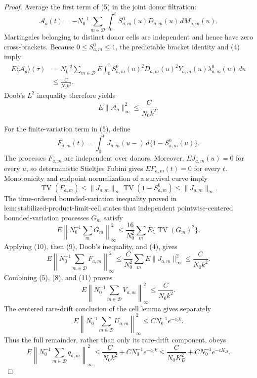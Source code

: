 \documentclass{article}
\begin{document}
\begin{proof}
Average the first term of (5) in the joint donor filtration:
\[
 \mathcal A_a(t)=-N_0^{-1}\sum_{m\in\mathcal D}
 \int_0^tS^0_{a,m}(u)D_{a,m}(u)\,dM_{a,m}(u).          \tag{6}
\]
Martingales belonging to distinct donor cells are independent and hence have
zero cross-brackets.  Because \(0\leq S^0_{a,m}\leq1\), the predictable
bracket identity and (4) imply
\[
 \begin{split}
 E\langle\mathcal A_a\rangle(\bar\tau)
 &=N_0^{-2}\sum_{m\in\mathcal D}E\int_0^{\bar\tau}
   S^0_{a,m}(u)^2D_{a,m}(u)^2Y_{a,m}(u)
   \lambda^0_{a,m}(u)\,du\\
 &\leq \frac{C}{N_0k^2}.
 \end{split}                                           \tag{7}
\]
Doob's \(L^2\) inequality therefore yields
\[
 E\|\mathcal A_a\|_\infty^2\leq\frac{C}{N_0k^2}.     \tag{8}
\]

For the finite-variation term in (5), define
\[
 F_{a,m}(t)=\int_0^tJ_{a,m}(u-)\,d\{1-S^0_{a,m}(u)\}.
\]
The processes \(F_{a,m}\) are independent over donors.  Moreover,
\(EJ_{a,m}(u)=0\) for every \(u\), so deterministic Stieltjes Fubini gives
\(EF_{a,m}(t)=0\) for every \(t\).  Monotonicity and endpoint normalization
of a survival curve imply
\[
 \operatorname{TV}(F_{a,m})
 \leq\|J_{a,m}\|_\infty
      \operatorname{TV}(1-S^0_{a,m})
 \leq\|J_{a,m}\|_\infty.                              \tag{9}
\]
The time-ordered bounded-variation inequality proved in
\(\mathrm{lem:stabilized\mbox{-}product\mbox{-}limit\mbox{-}cell}\)
states that independent pointwise-centered bounded-variation processes
\(G_m\) satisfy
\[
 E\left\|N_0^{-1}\sum_mG_m\right\|_\infty^2
 \leq\frac{16}{N_0^2}\sum_mE\{\operatorname{TV}(G_m)^2\}. \tag{10}
\]
Applying (10), then (9), Doob's inequality, and (4), gives
\[
 E\left\|N_0^{-1}\sum_{m\in\mathcal D}F_{a,m}\right\|_\infty^2
 \leq\frac{C}{N_0^2}\sum_mE\|J_{a,m}\|_\infty^2
 \leq\frac{C}{N_0k^2}.                                \tag{11}
\]
Combining (5), (8), and (11) proves
\[
 E\left\|N_0^{-1}\sum_{m\in\mathcal D}V_{a,m}\right\|_\infty^2
 \leq\frac{C}{N_0k^2}.                                \tag{12}
\]
The centered rare-drift conclusion of the cell lemma gives separately
\[
 E\left\|N_0^{-1}\sum_{m\in\mathcal D}U_{a,m}\right\|_\infty^2
 \leq C N_0^{-1}e^{-c_0k}.                             \tag{13}
\]
Thus the full remainder, rather than only its rare-drift component, obeys
\[
 E\left\|N_0^{-1}\sum_{m\in\mathcal D}q_{a,m}\right\|_\infty^2
 \leq\frac{C}{N_0k^2}+C N_0^{-1}e^{-c_0k}
 \leq\frac{C}{N_0K_D^2}+C N_0^{-1}e^{-cK_D}.           \tag{14}
\]


\end{proof}
\end{document}
